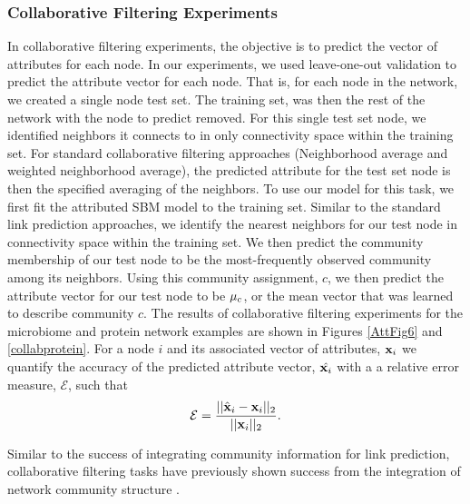 \subsubsection{Collaborative Filtering Experiments}
In collaborative filtering experiments, the objective is to predict the vector of attributes for each node. In our experiments, we used leave-one-out validation to predict the attribute vector for each node. That is, for each node in the network, we created a single node test set. The training set, was then the rest of the network with the node to predict removed. For this single test set node, we identified neighbors it connects to in only connectivity space within the training set. For standard collaborative filtering approaches (Neighborhood average and weighted neighborhood average), the predicted attribute for the test set node is then the specified averaging of the neighbors. To use our model for this task, we first fit the attributed SBM model to the training set. Similar to the standard link prediction approaches, we identify the nearest neighbors for our test node in connectivity space within the training set. We then predict the community membership of our test node to be the most-frequently observed community among its neighbors. Using this community assignment, $c$, we then predict the attribute vector for our test node to be ${\bf \mu}_{c}$, or the mean vector that was learned to describe community $c$. The results of collaborative filtering experiments for the microbiome and protein network examples are shown in Figures \ref{AttFig6} and \ref{collabprotein}. For a node $i$ and its associated vector of attributes, ${\bf x}_{i}$ we quantify the accuracy of the predicted attribute vector, $\hat{{\bf x}_{i}}$ with a a relative error measure, $\mathcal{E}$, such that 
\begin{equation}
\mathcal{E}=\frac{||\hat{\bf{x}}_{i}-{\bf x}_{i}||_{2}}{||{\bf x}_{i}||_{2}}.
\end{equation}

Similar to the success of integrating community information for link prediction, collaborative filtering tasks have previously shown success from the integration of network community structure \cite{collabComm}. 

